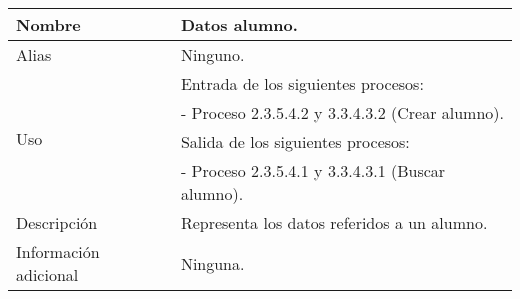 \begin{center}
  \begin{tabular}{| l | p{9cm} |}
    \hline
    Nombre & \textbf{Datos alumno}.\\
    \hline
    Alias & Ninguno.\\
    \hline
    \multirow{4}{*}{Uso} & Entrada de los siguientes procesos:\\
                         & - Proceso 2.3.5.4.2 y 3.3.4.3.2 (Crear alumno).\\
                         & Salida de los siguientes procesos:\\
                         & - Proceso 2.3.5.4.1 y 3.3.4.3.1 (Buscar alumno).\\
    \hline
    Descripción & Representa los datos referidos a un alumno.\\
    \hline
    Información adicional & Ninguna.\\
    \hline
  \end{tabular}
\end{center}
